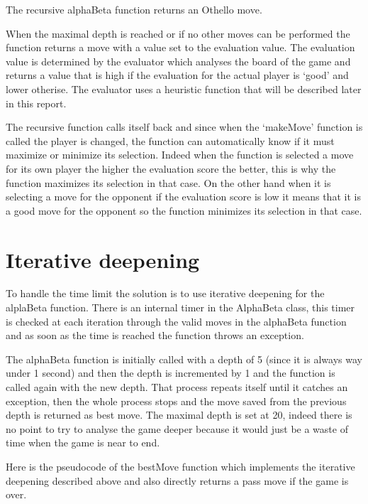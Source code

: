 The recursive alphaBeta function returns an Othello move.

When the maximal depth is reached or if no other moves can be performed the function returns a move with a value set to the evaluation value.
The evaluation value is determined by the evaluator which analyses the board of the game and returns a value that is high if the evaluation for the actual player is `good' and lower otherise.
The evaluator uses a heuristic function that will be described later in this report.

The recursive function calls itself back and since when the `makeMove' function is called the player is changed, the function can automatically know if it must maximize or minimize its selection.
Indeed when the function is selected a move for its own player the higher the evaluation score the better, this is why the function maximizes its selection in that case.
On the other hand when it is selecting a move for the opponent if the evaluation score is low it means that it is a good move for the opponent so the function minimizes its selection in that case.

\section{Iterative deepening}

To handle the time limit the solution is to use iterative deepening for the alplaBeta function.
There is an internal timer in the AlphaBeta class, this timer is checked at each iteration through the valid moves in the alphaBeta function and as soon as the time is reached the function throws an exception.

The alphaBeta function is initially called with a depth of 5 (since it is always way under 1 second) and then the depth is incremented by 1 and the function is called again with the new depth.
That process repeats itself until it catches an exception, then the whole process stops and the move saved from the previous depth is returned as best move.
The maximal depth is set at 20, indeed there is no point to try to analyse the game deeper because it would just be a waste of time when the game is near to end.

Here is the pseudocode of the bestMove function which implements the iterative deepening described above and also directly returns a pass move if the game is over.

